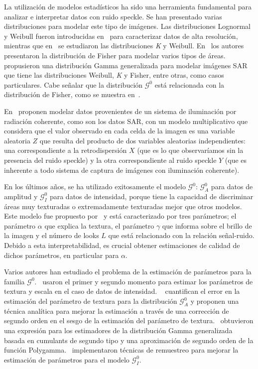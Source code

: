 La utilización de modelos estadísticos ha sido una herramienta fundamental para analizar e interpretar datos con ruido speckle. Se han presentado varias distribuciones para modelar este tipo de imágenes. Las distribuciones Lognormal y Weibull fueron introducidas en~\citet{oliverquegan98} para caracterizar datos de alta resolución, mientras que en~\citet{Oliver1993} se estudiaron las distribuciones \textit{K} y Weibull. En~\citet{Tison2004} los autores presentaron la distribución de Fisher para modelar varios tipos de áreas.~\citet{Li2011} propusieron una distribución Gamma generalizada para modelar imágenes SAR que tiene las distribuciones Weibull, \textit{K} y Fisher, entre otras, como casos particulares. Cabe señalar que la distribución $\mathcal{G}^0$ está relacionada con la distribución de Fisher, como se muestra en~\citet{MejailJacoboFreryBustos:IJRS}.

En~\citet{oliverquegan98} proponen modelar datos provenientes de un sistema de iluminación por radiación coherente, como son los datos SAR, con un modelo multiplicativo que considera que el valor observado en cada celda de la imagen es una variable aleatoria $Z$ que resulta del producto de dos variables aleatorias independientes: una correspondiente a la retrodispersión $X$ (que es lo que observaríamos sin la presencia del ruido speckle) y la otra correspondiente al ruido speckle $Y$ (que es inherente a todo sistema de captura de imágenes con iluminación coherente). 

En los últimos años, se ha utilizado exitosamente el modelo $\mathcal{G}^0$: $\mathcal{G}_A^0$ para datos de amplitud y $\mathcal G_I^0$ para datos de intensidad, porque tiene la capacidad de discriminar áreas muy texturadas o extremadamente texturadas mejor que otros modelos. Este modelo fue propuesto por~\citet{Frery97} y está caracterizado por tres parámetros; el parámetro $\alpha$ que explica la textura, el parámetro $\gamma $ que informa sobre el brillo de la imagen y el número de looks $L$ que está relacionado con la relación señal-ruido.
Debido a esta interpretabilidad, es crucial obtener estimaciones de calidad de dichos parámetros, en particular para $\alpha$.

Varios autores han estudiado el problema de la estimación de parámetros para la familia $\mathcal G^0$.~\citet{Freitas2005} usaron el primer y segundo momento para estimar los parámetros de textura y escala en el caso de datos de intensidad.
~\citet{VasconcellosFrerySilva:CompStat} cuantifican el error en la estimación del parámetro de textura para la distribución $\mathcal G_A^0$ y proponen una técnica analítica para mejorar la estimación a través de una corrección de segundo orden en el sesgo de la estimación del parámetro de textura.~\citet{Li2011} obtuvieron una expresión para los estimadores de la distribución Gamma generalizada basada en cumulants de segundo tipo y una aproximación de segundo orden de la función Polygamma.~\citet{CribariFrerySilva:CSDA} implementaron técnicas de remuestreo para mejorar la estimación de parámetros para el modelo $\mathcal G_I^0$.

